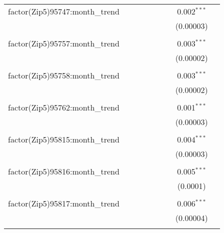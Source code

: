 \begin{table}[H]
{\begin{tabular}{@{\extracolsep{5pt}}lcccccccc}
  factor(Zip5)95747:month\_trend &  &  &  &  &  &  & 0.002$^{***}$ &  \\  

   &  &  &  &  &  &  & (0.00003) &  \\  

   & & & & & & & & \\  

  factor(Zip5)95757:month\_trend &  &  &  &  &  &  & 0.003$^{***}$ &  \\  

   &  &  &  &  &  &  & (0.00002) &  \\  

   & & & & & & & & \\  

  factor(Zip5)95758:month\_trend &  &  &  &  &  &  & 0.003$^{***}$ &  \\  

   &  &  &  &  &  &  & (0.00002) &  \\  

   & & & & & & & & \\  

  factor(Zip5)95762:month\_trend &  &  &  &  &  &  & 0.001$^{***}$ &  \\  

   &  &  &  &  &  &  & (0.00003) &  \\  

   & & & & & & & & \\  

  factor(Zip5)95815:month\_trend &  &  &  &  &  &  & 0.004$^{***}$ &  \\  

   &  &  &  &  &  &  & (0.00003) &  \\  

   & & & & & & & & \\  

  factor(Zip5)95816:month\_trend &  &  &  &  &  &  & 0.005$^{***}$ &  \\  

   &  &  &  &  &  &  & (0.0001) &  \\  

   & & & & & & & & \\  

  factor(Zip5)95817:month\_trend &  &  &  &  &  &  & 0.006$^{***}$ &  \\  

   &  &  &  &  &  &  & (0.00004) &  \\  

   & & & & & & & & \\  


\end{tabular}}
\end{table}
